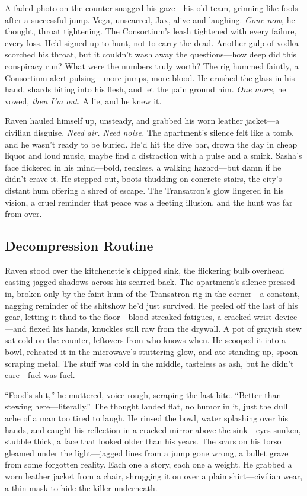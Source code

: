 \documentclass[12pt]{book}
\begin{document}
A faded photo on the counter snagged his gaze---his old team, grinning like fools after a successful jump. Vega, unscarred, Jax, alive and laughing. \textit{Gone now,} he thought, throat tightening. The Consortium’s leash tightened with every failure, every loss. He’d signed up to hunt, not to carry the dead. Another gulp of vodka scorched his throat, but it couldn’t wash away the questions---how deep did this conspiracy run? What were the numbers truly worth? The rig hummed faintly, a Consortium alert pulsing---more jumps, more blood. He crushed the glass in his hand, shards biting into his flesh, and let the pain ground him. \textit{One more,} he vowed, \textit{then I’m out.} A lie, and he knew it.

Raven hauled himself up, unsteady, and grabbed his worn leather jacket---a civilian disguise. \textit{Need air. Need noise.} The apartment’s silence felt like a tomb, and he wasn’t ready to be buried. He’d hit the dive bar, drown the day in cheap liquor and loud music, maybe find a distraction with a pulse and a smirk. Sasha’s face flickered in his mind---bold, reckless, a walking hazard---but damn if he didn’t crave it. He stepped out, boots thudding on concrete stairs, the city’s distant hum offering a shred of escape. The Transatron’s glow lingered in his vision, a cruel reminder that peace was a fleeting illusion, and the hunt was far from over.

\subsection{Decompression Routine}

Raven stood over the kitchenette’s chipped sink, the flickering bulb overhead casting jagged shadows across his scarred back. The apartment’s silence pressed in, broken only by the faint hum of the Transatron rig in the corner—a constant, nagging reminder of the shitshow he’d just survived. He peeled off the last of his gear, letting it thud to the floor—blood-streaked fatigues, a cracked wrist device—and flexed his hands, knuckles still raw from the drywall. A pot of grayish stew sat cold on the counter, leftovers from who-knows-when. He scooped it into a bowl, reheated it in the microwave’s stuttering glow, and ate standing up, spoon scraping metal. The stuff was cold in the middle, tasteless as ash, but he didn’t care—fuel was fuel.

“Food’s shit,” he muttered, voice rough, scraping the last bite. “Better than stewing here—literally.” The thought landed flat, no humor in it, just the dull ache of a man too tired to laugh. He rinsed the bowl, water splashing over his hands, and caught his reflection in a cracked mirror above the sink—eyes sunken, stubble thick, a face that looked older than his years. The scars on his torso gleamed under the light—jagged lines from a jump gone wrong, a bullet graze from some forgotten reality. Each one a story, each one a weight. He grabbed a worn leather jacket from a chair, shrugging it on over a plain shirt—civilian wear, a thin mask to hide the killer underneath.
\end{document}
